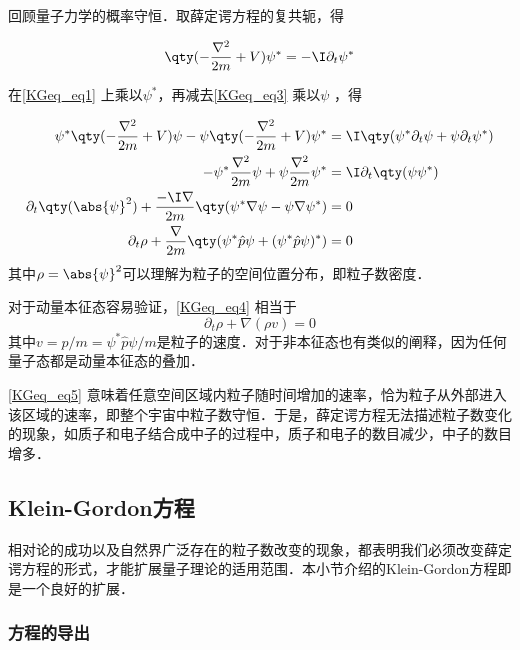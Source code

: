 回顾量子力学的概率守恒．取薛定谔方程的复共轭，得

\begin{equation}\label{KGeq_eq3}
\qty(-\frac{\nabla^2}{2m}+V)\psi^* = -\I \partial_t \psi^*
\end{equation}

在\autoref{KGeq_eq1} 上乘以$\psi^*$，再减去\autoref{KGeq_eq3} 乘以$\psi$ ，得

\begin{equation}\label{KGeq_eq4}
\begin{aligned}
\psi^*\qty(-\frac{\nabla^2}{2m}+V)\psi - \psi\qty(-\frac{\nabla^2}{2m}+V)\psi^* &= \I\qty(\psi^*\partial_t\psi + \psi\partial_t\psi^*)\\
-\psi^*\frac{\nabla^2}{2m}\psi + \psi\frac{\nabla^2}{2m}\psi^* &= \I \partial_t\qty(\psi\psi^*)\\
\partial_t\qty(\abs{\psi}^2) + \frac{-\I\nabla}{2m}\qty(\psi^*\nabla\psi-\psi\nabla\psi^*) &= 0\\
\partial_t \rho + \frac{\nabla}{2m} \qty(\psi^*\hat{p}\psi + (\psi^*\hat{p}\psi)^*) &= 0
\end{aligned}
\end{equation}
其中$\rho=\abs{\psi}^2$可以理解为粒子的空间位置分布，即粒子数密度．

对于动量本征态容易验证，\autoref{KGeq_eq4} 相当于
\begin{equation}\label{KGeq_eq5}
\partial_t\rho + \nabla(\rho v) = 0
\end{equation}
其中$v=p/m=\psi^*\hat{p}\psi/m$是粒子的速度．对于非本征态也有类似的阐释，因为任何量子态都是动量本征态的叠加．

\autoref{KGeq_eq5} 意味着任意空间区域内粒子随时间增加的速率，恰为粒子从外部进入该区域的速率，即整个宇宙中粒子数守恒．于是，薛定谔方程无法描述粒子数变化的现象，如质子和电子结合成中子的过程中，质子和电子的数目减少，中子的数目增多．



\subsection{Klein-Gordon方程}

相对论的成功以及自然界广泛存在的粒子数改变的现象，都表明我们必须改变薛定谔方程的形式，才能扩展量子理论的适用范围．本小节介绍的Klein-Gordon方程即是一个良好的扩展．

\subsubsection{方程的导出}

